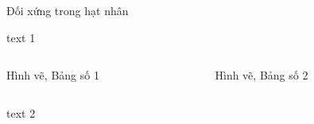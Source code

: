 \begin{frame}[label = doixung]{Đối xứng trong hạt nhân}

text 1

\begin{columns}[t]

	\begin{column}{0.4\textwidth}
 
 	 Hình vẽ, Bảng số 1
  
	\end{column}
	
	\begin{column}{0.4\textwidth}
 
 	Hình vẽ, Bảng số 2
  
	\end{column}
	
\end{columns}

text 2

\end{frame}